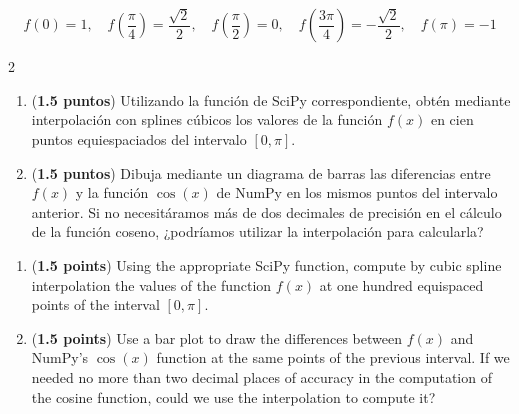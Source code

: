 \begin{equation*}
	f(0) = 1, \quad f \left(\frac{\pi}{4}\right)= \frac{\sqrt{2}}{2}, \quad f \left(\frac{\pi}{2}\right) = 0, \quad f \left(\frac{3\pi}{4}\right) = -\frac{\sqrt{2}}{2}, \quad f(\pi) = -1
\end{equation*}

\begin{paracol}{2}
\begin{enumerate}
	\item (\textbf{1.5 puntos}) Utilizando la función de SciPy correspondiente, obtén mediante interpolación con splines cúbicos los valores de la función $f(x)$ en cien puntos equiespaciados del intervalo $[0,\pi]$.

	\item (\textbf{1.5 puntos}) Dibuja mediante un diagrama de barras las diferencias entre $f(x)$ y la función $\cos(x)$ de NumPy en los mismos puntos del intervalo anterior. Si no necesitáramos más de dos decimales de precisión en el cálculo de la función coseno, ¿podríamos utilizar la interpolación para calcularla?
\end{enumerate}
\switchcolumn
\begin{enumerate}
	\item (\textbf{1.5 points}) Using the appropriate SciPy function, compute by cubic spline interpolation the values of the function $f(x)$ at one hundred equispaced points of the interval $[0,\pi]$.

	\item (\textbf{1.5 points}) Use a bar plot to draw the differences between $f(x)$ and NumPy's $\cos(x)$ function at the same points of the previous interval. If we needed no more than two decimal places of accuracy in the computation of the cosine function, could we use the interpolation to compute it?
\end{enumerate}
\end{paracol}

\fussy
